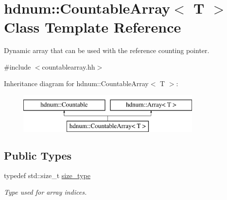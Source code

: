 \hypertarget{classhdnum_1_1CountableArray}{
\section{hdnum::CountableArray$<$ T $>$ Class Template Reference}
\label{classhdnum_1_1CountableArray}
}


Dynamic array that can be used with the reference counting pointer.  




{\ttfamily \#include $<$countablearray.hh$>$}

Inheritance diagram for hdnum::CountableArray$<$ T $>$:\begin{figure}[H]
\begin{center}
\leavevmode
\includegraphics[height=2cm]{classhdnum_1_1CountableArray}
\end{center}
\end{figure}
\subsection*{Public Types}
\begin{DoxyCompactItemize}
\item 
\hypertarget{classhdnum_1_1CountableArray_a8505dbe8243864d347eb74d46d5c4fb7}{
typedef std::size\_\-t \hyperlink{classhdnum_1_1CountableArray_a8505dbe8243864d347eb74d46d5c4fb7}{size\_\-type}}
\label{classhdnum_1_1CountableArray_a8505dbe8243864d347eb74d46d5c4fb7}

\begin{DoxyCompactList}\small\item\em Type used for array indices. \item\end{DoxyCompactList}\end{DoxyCompactItemize}
